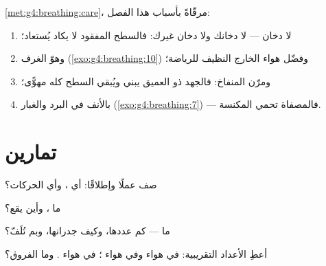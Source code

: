 \begin{method}\label{met:g7:lungs-and-gas-exchange:keep}
\cref{met:g4:breathing:care}، مرقّاةً بأسباب هذا
الفصل:
\begin{enumerate}
  \item لا دخان --- لا دخانك ولا دخان غيرك: فالسطح المفقود لا
        يكاد يُستعاد؛
  \item وهوّ الغرف (\cref{exo:g4:breathing:10}) وفضّل هواء
        الخارج النظيف للرياضة؛
  \item ومرّن المنفاخ: فالجهد ذو  العميق يبني  
        ويُبقي السطح كله مهوًّى؛
  \item {} بالأنف في البرد والغبار
        (\cref{exo:g4:breathing:7}) --- فالمصفاة تحمي المكنسة.
\end{enumerate}
\end{method}

\section{تمارين}

\begin{exercise}[$\star$]\label{exo:g7:lungs-and-gas-exchange:1}
صف   عملًا وإطلاقًا: أي ، وأي الحركات؟
\end{exercise}

\begin{exercise}[$\star$]\label{exo:g7:lungs-and-gas-exchange:2}
ما ، وأين يقع؟
\end{exercise}

\begin{exercise}[$\star$]\label{exo:g7:lungs-and-gas-exchange:3}
ما  --- كم عددها، وكيف جدرانها، وبم تُلَفّ؟
\end{exercise}

\begin{exercise}[$\star$]\label{exo:g7:lungs-and-gas-exchange:4}
أعطِ الأعداد التقريبية:  في هواء  وفي هواء ؛
 في هواء . وما الفروق؟
\end{exercise}

